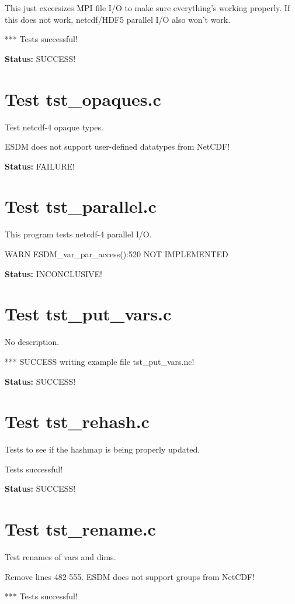This just excersizes MPI file I/O to make sure everything's working properly. If this does not work, netcdf/HDF5 parallel I/O also won't work.

*** Tests successful!

{\bf \large Status: } SUCCESS!

\section{Test tst\_opaques.c}

Test netcdf-4 opaque types.

ESDM does not support user-defined datatypes from NetCDF!

{\bf \large Status: } FAILURE!

\section{Test tst\_parallel.c}

This program tests netcdf-4 parallel I/O.

WARN ESDM\_var\_par\_access():520 NOT IMPLEMENTED

{\bf \large Status: } INCONCLUSIVE!

\section{Test tst\_put\_vars.c}

No description.

*** SUCCESS writing example file tst\_put\_vars.nc!

{\bf \large Status: } SUCCESS!

\section{Test tst\_rehash.c}

Tests to see if the hashmap is being properly updated.

Tests successful!

{\bf \large Status: } SUCCESS!

\section{Test tst\_rename.c}

Test renames of vars and dims.

Remove lines 482-555. ESDM does not support groups from NetCDF!

*** Tests successful!

